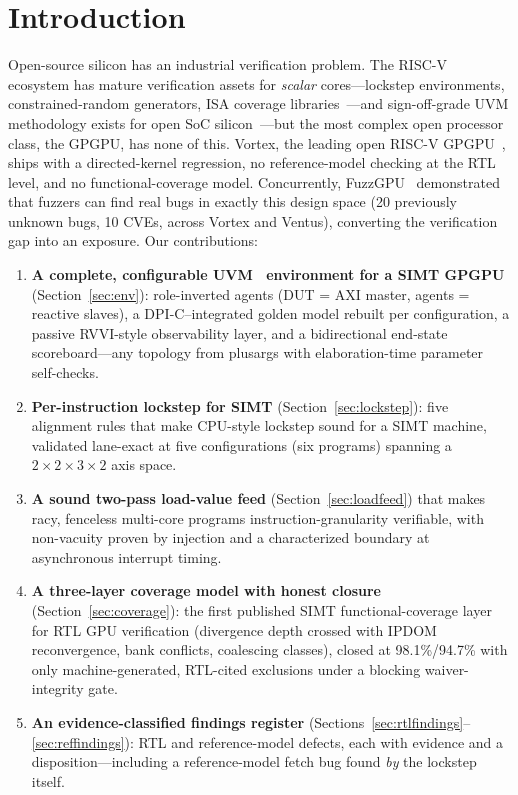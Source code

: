 \documentclass[conference]{IEEEtran}
\newcommand{\code}[1]{\texttt{\detokenize{#1}}}
\begin{document}
\section{Introduction}
Open-source silicon has an industrial verification problem. The RISC-V
ecosystem has mature verification assets for \emph{scalar}
cores---lockstep environments, constrained-random generators, ISA
coverage libraries~\cite{corevverif, riscvdv, rvvi, imperasdv,
	difftest}---and sign-off-grade UVM methodology exists for open SoC
silicon~\cite{opentitan}---but the most complex open processor class, the GPGPU, has
none of this. Vortex, the leading open RISC-V
GPGPU~\cite{vortex-micro, vortex-carrv}, ships with a directed-kernel
regression, no reference-model checking at the RTL level, and no
functional-coverage model. Concurrently, FuzzGPU~\cite{fuzzgpu}
demonstrated that fuzzers can find real bugs in exactly this design
space (20 previously unknown bugs, 10 CVEs, across Vortex and Ventus),
converting the verification gap into an exposure. Our contributions:

\begin{enumerate}
	\item \textbf{A complete, configurable UVM~\cite{uvm} environment for a
		      SIMT
		      GPGPU} (Section~\ref{sec:env}): role-inverted agents (DUT = AXI master,
	      agents = reactive slaves), a DPI-C--integrated golden model rebuilt per
	      configuration, a passive RVVI-style observability layer, and a
	      bidirectional end-state scoreboard---any topology from plusargs with
	      elaboration-time parameter self-checks.
	\item \textbf{Per-instruction lockstep for SIMT}
	      (Section~\ref{sec:lockstep}): five alignment rules that make CPU-style
	      lockstep sound for a SIMT machine, validated lane-exact at five
	      configurations (six programs) spanning a $2\times2\times3\times2$
	      axis space.
	\item \textbf{A sound two-pass load-value feed}
	      (Section~\ref{sec:loadfeed}) that makes racy, fenceless multi-core
	      programs instruction-granularity verifiable, with non-vacuity proven by
	      injection and a characterized boundary at asynchronous interrupt
	      timing.
	\item \textbf{A three-layer coverage model with honest closure}
	      (Section~\ref{sec:coverage}): the first published SIMT
	      functional-coverage layer for RTL GPU verification (divergence depth
	      crossed with IPDOM reconvergence, bank conflicts, coalescing classes),
	      closed at 98.1\%/94.7\% with only machine-generated, RTL-cited
	      exclusions under a blocking waiver-integrity gate.
	\item \textbf{An evidence-classified findings register}
	      (Sections~\ref{sec:rtlfindings}--\ref{sec:reffindings}): RTL and
	      reference-model defects, each with \code{file:line} evidence and a
	      disposition---including a reference-model fetch bug found \emph{by} the
	      lockstep itself.
\end{enumerate}
\end{document}
